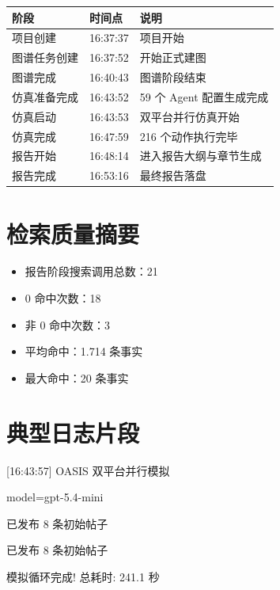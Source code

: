 \documentclass[UTF8,10pt,oneside]{ctexbook}
\begin{document}
\begin{table}[H]
\centering
\small
\begin{tabularx}{\textwidth}{p{4cm}p{3.6cm}X}
\toprule
阶段 & 时间点 & 说明 \\
\midrule
项目创建 & 16:37:37 & 项目开始 \\
图谱任务创建 & 16:37:52 & 开始正式建图 \\
图谱完成 & 16:40:43 & 图谱阶段结束 \\
仿真准备完成 & 16:43:52 & 59 个 Agent 配置生成完成 \\
仿真启动 & 16:43:53 & 双平台并行仿真开始 \\
仿真完成 & 16:47:59 & 216 个动作执行完毕 \\
报告开始 & 16:48:14 & 进入报告大纲与章节生成 \\
报告完成 & 16:53:16 & 最终报告落盘 \\
\bottomrule
\end{tabularx}
\end{table}

\section{检索质量摘要}

\begin{itemize}
  \item 报告阶段搜索调用总数：21
  \item 0 命中次数：18
  \item 非 0 命中次数：3
  \item 平均命中：1.714 条事实
  \item 最大命中：20 条事实
\end{itemize}

\section{典型日志片段}

\begin{tcolorbox}[colback=SoftGray,colframe=black!30,title=仿真日志摘录]
\small\ttfamily\raggedright
[16:43:57] OASIS 双平台并行模拟\par
[16:43:57] [通用LLM] model=gpt-5.4-mini\par
[16:44:05] [Twitter] 已发布 8 条初始帖子\par
[16:47:17] [Reddit] 已发布 8 条初始帖子\par
[16:47:58] 模拟循环完成! 总耗时: 241.1 秒
\end{tcolorbox}
\end{document}
